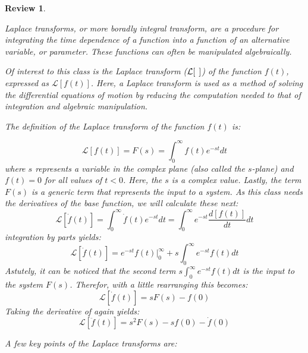 \documentclass[12pt,letter]{article}
\numberwithin{ex}{section} %
\newtheorem{re}{Review}
\numberwithin{re}{section} %
\newenvironment{review}{\begin{mdframed}[middlelinewidth=2mm,roundcorner=20pt]\begin{re}\normalfont}{\end{re}\end{mdframed}}
\newcommand{\Laplace}[1]{\ensuremath{\mathcal{L}{\left[#1\right]}}}
\begin{document}
\begin{review}
	\label{sec:Laplace_review}
				
		Laplace transforms, or more boradly integral transform, are a procedure for integrating the time dependence of a function into a function of an alternative variable, or parameter. These functions can often be manipulated algebraically. 
		
		Of interest to this class is the Laplace transform ($\Laplace{\hspace{1ex}}$) of the function $f(t)$, expressed as $\Laplace{f(t)}$. Here, a Laplace transform is used as a method of solving the differential equations of motion by reducing the computation needed to that of integration and algebraic manipulation. 
		
		The definition of the Laplace transform of the function $f(t)$ is:
		
		\begin{equation}
				\Laplace{f(t)} = F(s) = \int_{0}^{\infty} f(t)e^{-st}dt
		\end{equation}
		where $s$ represents a variable in the complex plane (also called the $s$-plane) and $f(t)=0$ for all values of $t<0$. Here, the $s$ is a complex value. Lastly, the term $F(s)$ is a generic term that  represents the input to a system. As this class needs the derivatives of the base function, we will calculate these next:
		\begin{equation}
			\Laplace{\dot{f}(t)} = \int_{0}^{\infty} \dot{f}(t)e^{-st}dt = \int_{0}^{\infty} e^{-st}\frac{d[f(t)]}{dt}dt 
		\end{equation}		
		integration by parts yields:
		\begin{equation}
			\Laplace{\dot{f}(t)} = e^{-st}f(t)\Big|_0^\infty+s\int_{0}^{\infty}e^{-st}f(t)dt
		\end{equation}
		Astutely, it can be noticed that the second term $s\int_{0}^{\infty}e^{-st}f(t)dt$
		is the input to the system $F(s)$. Therefor, with a little rearranging this becomes:
		\begin{equation}
			\Laplace{\dot{f}(t)} = sF(s)-f(0)
		\end{equation}
		Taking the derivative of again yields:
		\begin{equation}
			\Laplace{\ddot{f}(t)} = s^2F(s)-sf(0)-\dot{f}(0)
		\end{equation}
		
		A few key points of the Laplace transforms are:
				

\end{review}
\end{document}
